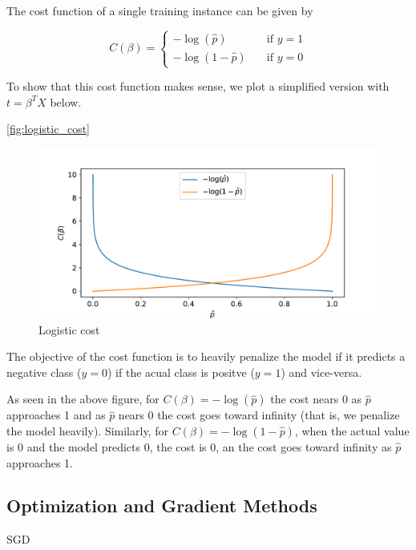 The cost function of a single training instance can be given by

\begin{equation}
    C(\beta) = \begin{cases} - \log(\hat{p}) &\quad \text{if } y=1 \\ - \log(1-\hat{p}) &\quad \text{if } y=0  \end{cases}
\end{equation}

To show that this cost function makes sense, we plot a simplified version with $t=\beta^T X$ below.

\autoref{fig:logistic_cost}

\begin{figure}[H]
\begin{center}\includegraphics[scale=0.6]{latex/figures/logistic_cost_func.pdf}
\end{center}
\caption{Logistic cost}
\label{fig:logistic_cost}
\end{figure}

The objective of the cost function is to heavily penalize the model if it predicts a negative class ($y=0$) if the acual class is positve ($y=1$) and vice-versa. 

As seen in the above figure, for $C(\beta) = - \log(\hat{p})$ the cost nears 0 as $\hat{p}$ approaches 1 and as $\hat{p}$ nears 0 the cost goes toward infinity (that is, we penalize the model heavily). Similarly, for $C(\beta) = - \log(1 - \hat{p})$, when the actual value is 0 and the model predicts 0, the cost is 0, an the cost goes toward infinity as $\hat{p}$ approaches 1.


\subsection{Optimization and Gradient Methods}\label{sec:optim theory}
SGD

